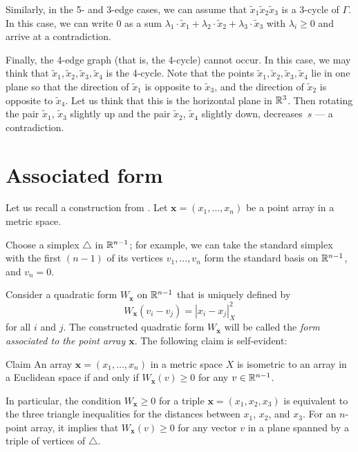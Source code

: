\documentclass{article}
\begin{document}
Similarly, in the 5- and 3-edge cases, we can assume that $\tilde x_1\tilde x_2\tilde x_3$ is a 3-cycle of $\Gamma$.
In this case, we can write $0$ as a sum $\lambda_1\cdot \tilde x_1+\lambda_2\cdot\tilde x_2+\lambda_3\cdot\tilde x_3$ with $\lambda_i\ge0$ and arrive at a contradiction.

Finally, the 4-edge graph (that is, the 4-cycle) cannot occur.
In this case, we may think that $\tilde x_1,\tilde x_2,\tilde x_3,\tilde x_4$ is the 4-cycle.
Note that the points $\tilde x_1,\tilde x_2,\tilde x_3,\tilde x_4$  lie in one plane so that the direction of $\tilde x_1$ is opposite to $\tilde x_3$,
and the direction of $\tilde x_2$ is opposite to $\tilde x_4$.
Let us think that this is the horizontal plane in $\mathbb{R}^3$.
Then rotating the pair $\tilde x_1$, $\tilde x_3$ slightly up and 
the pair $\tilde x_2$, $\tilde x_4$  slightly down, decreases~$s$ --- a contradiction.
\qeds

\section{Associated form}

Let us recall a construction from \cite{petrunin-2017}.
Let $\bm{x}=(x_1,\dots,x_n)$ be a point array in a metric space.

Choose a simplex $\triangle$ in $\mathbb{R}^{n-1}$; for example, we can take the standard simplex with the first $(n-1)$ of its vertices $v_1,\dots,v_n$ form the standard basis on $\mathbb{R}^{n-1}$,
 and $v_n=0$.

Consider a quadratic form $W_{\bm{x}}$ on $\mathbb{R}^{n-1}$ that is uniquely defined by
\[W_{\bm{x}}(v_i-v_j)=|x_i-x_j|^2_X\] 
for all $i$ and $j$.
The constructed quadratic form $W_{\bm{x}}$ will be called
the \emph{form associated to the point array $\bm{x}$}.
The following claim is self-evident:

\begin{thm}{Claim}\label{clm:W>=0}
An array $\bm{x}=(x_1,\dots,x_n)$ in a metric space $X$ is isometric to an array in a Euclidean space if and only if 
$W_{\bm{x}}(v)\ge 0$
for any $v\in \mathbb{R}^{n-1}$.
\end{thm}


In particular, the condition $W_{\bm{x}}\ge 0$ for a triple $\bm{x}=(x_1,x_2,x_3)$ is equivalent to 
the three triangle inequalities for the distances between $x_1$, $x_2$, and $x_3$.
For an $n$-point array, it implies that $W_{\bm{x}}(v)\ge 0$ for any vector $v$ in a plane spanned by a triple of vertices of $\triangle$.
\end{document}
